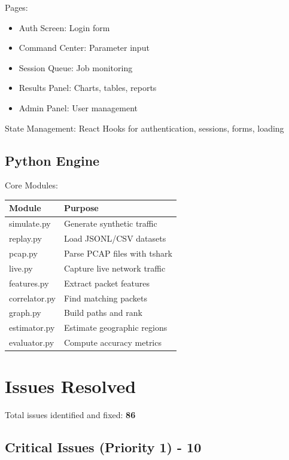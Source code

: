 \documentclass[12pt,a4paper]{report}
\begin{document}
Pages:
\begin{itemize}
    \item Auth Screen: Login form
    \item Command Center: Parameter input
    \item Session Queue: Job monitoring
    \item Results Panel: Charts, tables, reports
    \item Admin Panel: User management
\end{itemize}

State Management: React Hooks for authentication, sessions, forms, loading

\section{Python Engine}

Core Modules:

\begin{tabular}{|l|p{6cm}|}
\hline
\textbf{Module} & \textbf{Purpose} \\
\hline
simulate.py & Generate synthetic traffic \\
replay.py & Load JSONL/CSV datasets \\
pcap.py & Parse PCAP files with tshark \\
live.py & Capture live network traffic \\
features.py & Extract packet features \\
correlator.py & Find matching packets \\
graph.py & Build paths and rank \\
estimator.py & Estimate geographic regions \\
evaluator.py & Compute accuracy metrics \\
\hline
\end{tabular}

\chapter{Issues Resolved}

Total issues identified and fixed: \textbf{86}

\section{Critical Issues (Priority 1) - 10}
\end{document}
